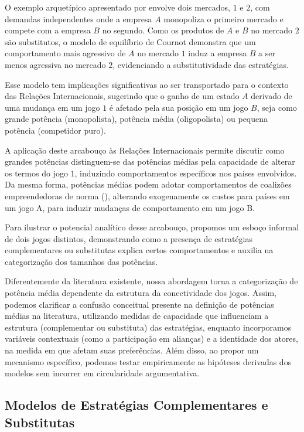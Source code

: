 \documentclass[]{interact}
\theoremstyle{plain}%
\theoremstyle{definition}
\theoremstyle{remark}
\begin{document}
O exemplo arquetípico apresentado por \citet{bulow_etal_1985} envolve
dois mercados, \(1\) e \(2\), com demandas independentes onde a empresa
\(A\) monopoliza o primeiro mercado e compete com a empresa \(B\) no
segundo. Como os produtos de \(A\) e \(B\) no mercado \(2\) são
substitutos, o modelo de equilíbrio de Cournot demonstra que um
comportamento mais agressivo de \(A\) no mercado \(1\) induz a empresa
\(B\) a ser menos agressiva no mercado \(2\), evidenciando a
substitutividade das estratégias.

Esse modelo tem implicações significativas ao ser transportado para o
contexto das Relações Internacionais, sugerindo que o ganho de um estado
\(A\) derivado de uma mudança em um jogo \(1\) é afetado pela sua
posição em um jogo \(B\), seja como grande potência (monopolista),
potência média (oligopolista) ou pequena potência (competidor puro).

A aplicação deste arcabouço às Relações Internacionais permite discutir
como grandes potências distinguem-se das potências médias pela
capacidade de alterar os termos do jogo \(1\), induzindo comportamentos
específicos nos países envolvidos. Da mesma forma, potências médias
podem adotar comportamentos de coalizões empreendedoras de norma
(\citet{ravenhill_2018}), alterando exogenamente os custos para países
em um jogo A, para induzir mudanças de comportamento em um jogo B.

Para ilustrar o potencial analítico desse arcabouço, propomos um esboço
informal de dois jogos distintos, demonstrando como a presença de
estratégias complementares ou substitutas explica certos comportamentos
e auxilia na categorização dos tamanhos das potências.

Diferentemente da literatura existente, nossa abordagem torna a
categorização de potência média dependente da estrutura da conectividade
dos jogos. Assim, podemos clarificar a confusão conceitual presente na
definição de potências médias na literatura, utilizando medidas de
capacidade que influenciam a estrutura (complementar ou substituta) das
estratégias, enquanto incorporamos variáveis contextuais (como a
participação em alianças) e a identidade dos atores, na medida em que
afetam suas preferências. Além disso, ao propor um mecanismo específico,
podemos testar empiricamente as hipóteses derivadas dos modelos sem
incorrer em circularidade argumentativa.

\hypertarget{modelos-de-estratuxe9gias-complementares-e-substitutas}{%
\subsection{Modelos de Estratégias Complementares e
Substitutas}\label{modelos-de-estratuxe9gias-complementares-e-substitutas}}
\end{document}
